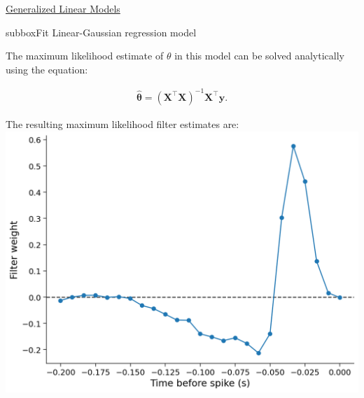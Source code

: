 \begin{textbox}{\href{https://compneuro.neuromatch.io/tutorials/W1D3_GeneralizedLinearModels/student/W1D3_Tutorial1.html}{Generalized Linear Models } }
\begin{subbox}{subbox}{Fit Linear-Gaussian regression model 
}
\scriptsize{The maximum likelihood estimate of $\theta$ in this model can be solved analytically using the equation:

\begin{align}
\boldsymbol{\hat \theta} = (\mathbf{X}^{\top}\mathbf{X})^{-1}\mathbf{X}^{\top}\mathbf{y}.
\end{align}}
The resulting maximum likelihood filter estimates are:
\centering
\includegraphics[scale=0.2]{Figures/GLM/GLMFigure2.png}
\end{subbox}
\end{textbox}
